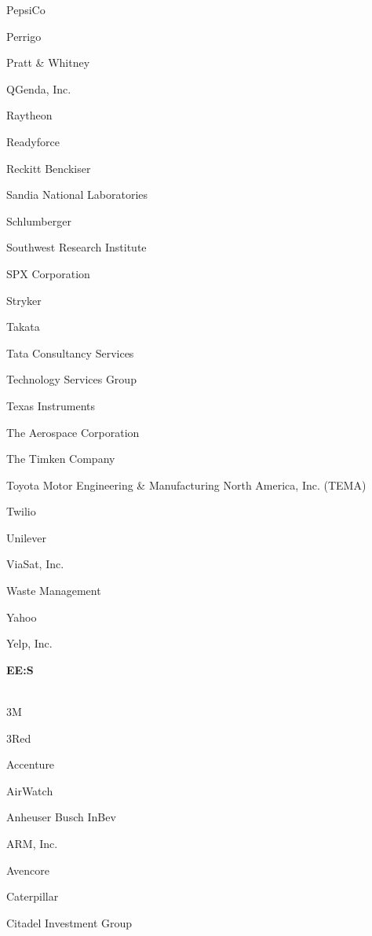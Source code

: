 \documentclass[twoside]{article}
\begin{document}
\begin{center}
\begin{multicols}{5}
\begin{FlushLeft}
\begin{compactitem}
\item PepsiCo
\item Perrigo
\item Pratt \& Whitney
\item QGenda, Inc.
\item Raytheon
\item Readyforce
\item Reckitt Benckiser
\item Sandia National Laboratories
\item Schlumberger
\item Southwest Research Institute
\item SPX Corporation
\item Stryker
\item Takata
\item Tata Consultancy Services
\item Technology Services Group
\item Texas Instruments
\item The Aerospace Corporation
\item The Timken Company
\item Toyota Motor Engineering \& Manufacturing North America, Inc. (TEMA)
\item Twilio
\item Unilever
\item ViaSat, Inc.
\item Waste Management
\item Yahoo
\item Yelp, Inc.
\end{compactitem}
        \end{FlushLeft}
        \vspace{1em}
        {\fontsize{14}{16}\selectfont \bf EE:S}\\
        \vspace{-1em}
        ~\hrulefill~
        \vspace{-.9em}
        \begin{FlushLeft}
        \begin{compactitem}
        \item 3M
\item 3Red
\item Accenture
\item AirWatch
\item Anheuser Busch InBev
\item ARM, Inc.
\item Avencore
\item Caterpillar
\item Citadel Investment Group

\end{compactitem}
\end{FlushLeft}
\end{multicols}
\end{center}
\end{document}
